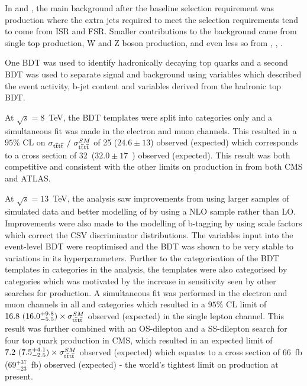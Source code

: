 In \runone and \runtwo, the main background after the baseline selection requirement was \ttbar production where the extra jets required to meet the selection requirements tend to come from ISR and FSR. Smaller contributions to the background came from single top production, W and Z boson production, and even less so from \ttH, \ttW, \ttZ. 

One BDT was used to identify hadronically decaying top quarks and a second BDT was used to separate signal and background using variables which described the event activity, b-jet content and variables derived from the hadronic top BDT.

At $\sqrt{s}=8$~TeV, the BDT templates were split into \njets categories only and a simultaneous fit was made in the electron and muon channels. This resulted in a $95\%$ CL on $\sigma_{{\mathrm{t}\overline{\mathrm{t}}\mathrm{t}\overline{\mathrm{t}}}}~/~\sigma_{{\mathrm{t}\overline{\mathrm{t}}\mathrm{t}\overline{\mathrm{t}}}}^{SM} $ of 25 ($24.6\pm13$) observed (expected) which corresponds to a cross section of 32~\fb ($32.0\pm17$~\fb) observed (expected). This result was both competitive and consistent with the other limits on \tttt production in \runone from both CMS and ATLAS.

At $\sqrt{s}=13$~TeV, the analysis saw improvements from using larger samples of simulated data and better modelling of \tttt by using a NLO sample rather than LO. Improvements were also made to the modelling of b-tagging by using scale factors which correct the CSV discriminator distributions.
The variables input into the event-level BDT were reoptimised and the BDT was shown to be very stable to variations in its hyperparameters. Further to the categorisation of the BDT templates in \njets categories in the \runone analysis, the templates were also categorised by \nMtags categories which was motivated by the increase in sensitivity seen by other searches for \tttt production. A simultaneous fit was performed in the electron and muon channels in all \njets and \nMtags categories which resulted in a $95\%$ CL limit of $16.8~(16.0^{+9.8}_{-5.5})\times \sigma_{{\mathrm{t}\overline{\mathrm{t}}\mathrm{t}\overline{\mathrm{t}}}}^{SM} $ observed (expected) in the single lepton channel. This result was further combined with an OS-dilepton and a SS-dilepton search for four top quark production in CMS, which resulted in an expected limit of $7.2~(7.5^{+4.1}_{-2.5})\times \sigma_{{\mathrm{t}\overline{\mathrm{t}}\mathrm{t}\overline{\mathrm{t}}}}^{SM} $ observed (expected) which equates to a cross section of 66~fb (69$^{+37}_{-23}$~fb) observed (expected) - the world's tightest limit on \tttt production at present.


